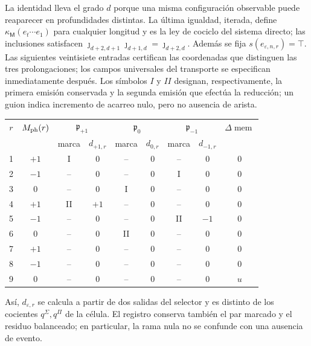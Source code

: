 La identidad lleva el grado \(d\) porque una misma configuración observable
puede reaparecer en profundidades distintas. La última igualdad, iterada, define
\(\kappa_{\mathsf M}(e_t\cdots e_1)\) para cualquier longitud y es la ley de
cociclo del sistema directo; las inclusiones satisfacen
\(\jmath_{d+2,d+1}\jmath_{d+1,d}=\jmath_{d+2,d}\).
Además se fija
\(s(e_{\varepsilon,n,r})=\top\). Las siguientes veintisiete entradas
certifican las coordenadas que distinguen las tres prolongaciones; los campos
universales del transporte se especifican inmediatamente después. Los símbolos \(I\) y \(II\)
designan, respectivamente, la primera emisión conservada y la segunda emisión
que efectúa la reducción; un guion indica incremento de acarreo nulo, pero no
ausencia de arista.
\begin{center}
\small
\setlength{\tabcolsep}{3.2pt}
\begin{tabular}{c c cc cc cc c}
\toprule
\(r\)&\(M_{\rm ph}(r)\)&\multicolumn{2}{c}{\(\mathfrak p_{+1}\)}&
\multicolumn{2}{c}{\(\mathfrak p_0\)}&
\multicolumn{2}{c}{\(\mathfrak p_{-1}\)}&
\(\Delta\operatorname{mem}\)\\
& &marca&\(d_{+1,r}\)&marca&\(d_{0,r}\)&marca&\(d_{-1,r}\)&\\
\midrule
1&\(+1\)&I&0&--&0&--&0&0\\
2&\(-1\)&--&0&--&0&I&0&0\\
3&0&--&0&I&0&--&0&0\\
4&\(+1\)&II&\(+1\)&--&0&--&0&0\\
5&\(-1\)&--&0&--&0&II&\(-1\)&0\\
6&0&--&0&II&0&--&0&0\\
7&\(+1\)&--&0&--&0&--&0&0\\
8&\(-1\)&--&0&--&0&--&0&0\\
9&0&--&0&--&0&--&0&\(u\)\\
\bottomrule
\end{tabular}
\end{center}
Así, \(d_{\varepsilon,r}\) se calcula a partir de dos salidas del selector y
es distinto de los cocientes \(q^\Sigma,q^\Pi\) de la célula. El registro
conserva también el par marcado y el residuo balanceado; en particular, la
rama nula no se confunde con una ausencia de evento.

